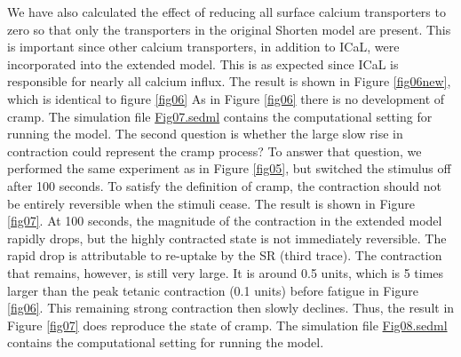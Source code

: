 \documentclass[fleqn,10pt]{physiome}
\begin{document}
We have also calculated the effect of reducing all surface calcium transporters to zero so that only the transporters in the original Shorten model are present. This is important since other calcium transporters, in addition to ICaL, were incorporated into the extended model. This is as expected since ICaL is responsible for nearly all calcium influx. The result is shown in Figure \ref{fig06new}, which is identical to figure \ref{fig06} As in Figure \ref{fig06} there is no development of cramp. The simulation file \href{http://models.cellml.org/workspace/5f4/file/4071d5b4ec40c5e2b845a7a75e942df1966d2ba2/Fig07.sedml}{Fig07.sedml} contains the computational setting for running the model. The second question is whether the large slow rise in contraction could represent the cramp process? To answer that question, we performed the same experiment as in Figure \ref{fig05}, but switched the stimulus off after 100 seconds. To satisfy the definition of cramp, the contraction should not be entirely reversible when the stimuli cease. The result is shown in Figure \ref{fig07}. At 100 seconds, the magnitude of the contraction in the extended model rapidly drops, but the highly contracted state is not immediately reversible. The rapid drop is attributable to re-uptake by the SR (third trace). The contraction that remains, however, is still very large. It is around 0.5 units, which is 5 times larger than the peak tetanic contraction (0.1 units) before fatigue in Figure \ref{fig06}. This remaining strong contraction then slowly declines. Thus, the result in Figure \ref{fig07} does reproduce the state of cramp. The simulation file \href{http://models.cellml.org/workspace/5f4/file/4071d5b4ec40c5e2b845a7a75e942df1966d2ba2/Fig08.sedml}{Fig08.sedml} contains the computational setting for running the model.
\end{document}
